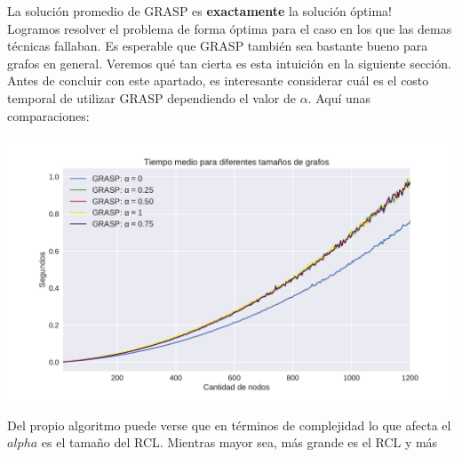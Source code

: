 La solución promedio de GRASP es \textbf{exactamente} la solución óptima! \\

Logramos resolver el problema de forma óptima para el caso en los que las demas técnicas fallaban. Es esperable que GRASP también sea bastante bueno para grafos en general. Veremos qué tan cierta es esta intuición en la siguiente sección. \\

Antes de concluir con este apartado, es interesante considerar cuál es el costo temporal de utilizar GRASP dependiendo el valor de $\alpha$. Aquí unas comparaciones:

{\centering
    \includegraphics[width=1\textwidth]{informe/imgs/exp_malo_tiempo_grasp.pdf}
}

Del propio algoritmo puede verse que en términos de complejidad lo que afecta el $alpha$ es el tamaño del RCL. Mientras mayor sea, más grande es el RCL y más 